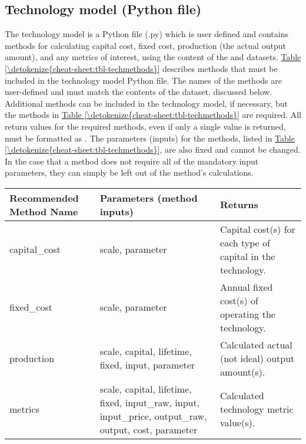 \documentclass[letterpaper,10pt,english]{sphinxmanual}
\begin{document}
\subsection{Technology model (Python file)}
\label{\detokenize{cheat-sheet:technology-model-python-file}}
The technology model is a Python file (.py) which is user defined and contains methods for calculating capital cost, fixed cost, production (the actual output amount), and any metrics of interest, using the content of the  and  datasets. \hyperref[\detokenize{cheat-sheet:tbl-techmethods}]{Table \ref{\detokenize{cheat-sheet:tbl-techmethods}}} describes methods that must be included in the technology model Python file. The names of the methods are user-defined and must match the contents of the  dataset, discussed below. Additional methods can be included in the technology model, if necessary, but the methods in \hyperref[\detokenize{cheat-sheet:tbl-techmethods}]{Table \ref{\detokenize{cheat-sheet:tbl-techmethods}}} are required. All return values for the required methods, even if only a single value is returned, must be formatted as . The parameters (inputs) for the methods, listed in \hyperref[\detokenize{cheat-sheet:tbl-techmethods}]{Table \ref{\detokenize{cheat-sheet:tbl-techmethods}}}, are also fixed and cannot be changed. In the case that a method does not require all of the mandatory input parameters, they can simply be left out of the method’s calculations.


\begin{savenotes}\sphinxattablestart
\centering
{}
\sphinxthecaptionisattop
{}\label{\detokenize{cheat-sheet:table-4}}\label{\detokenize{cheat-sheet:tbl-techmethods}}
\sphinxaftertopcaption
\begin{tabulary}{\linewidth}[t]{|T|T|T|}
\hline
\sphinxstyletheadfamily 
Recommended Method Name
&\sphinxstyletheadfamily 
Parameters (method inputs)
&\sphinxstyletheadfamily 
Returns
\\
\hline
capital\_cost
&
scale, parameter
&
Capital cost(s) for each type of capital in the technology.
\\
\hline
fixed\_cost
&
scale, parameter
&
Annual fixed cost(s) of operating the technology.
\\
\hline
production
&
scale, capital, lifetime, fixed, input, parameter
&
Calculated actual (not ideal) output amount(s).
\\
\hline
metrics
&
scale, capital, lifetime, fixed, input\_raw, input, input\_price, output\_raw, output, cost, parameter
&
Calculated technology metric value(s).
\\
\hline
\end{tabulary}
\par
\sphinxattableend\end{savenotes}
\end{document}
